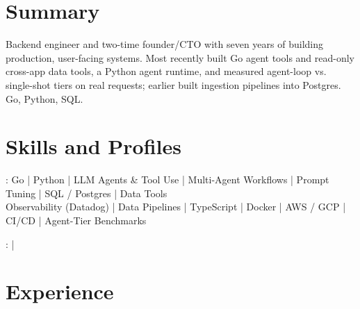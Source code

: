 \documentclass[print]{jack-resume}
\begin{document}
\pagecolor{darkmodeBackground}


\begin{minipage}[t][1cm][t]{.03\textwidth}
    \hfill
\end{minipage}

\section{Summary}
Backend engineer and two-time founder/CTO with seven years of building production, user-facing systems. Most recently built Go agent tools and read-only cross-app data tools, a Python agent runtime, and measured agent-loop vs. single-shot tiers on real requests; earlier built ingestion pipelines into Postgres. Go, Python, SQL.
\sectionsep

\section{Skills and Profiles}
:
Go \hfill | \hfill
Python \hfill | \hfill
LLM Agents \& Tool Use \hfill | \hfill
Multi-Agent Workflows \hfill | \hfill
Prompt Tuning \hfill | \hfill
SQL / Postgres \hfill | \hfill
Data Tools \\
\hspace{1.0cm} Observability (Datadog) \hfill | \hfill
Data Pipelines \hfill | \hfill
TypeScript \hfill | \hfill
Docker \hfill | \hfill
AWS / GCP \hfill | \hfill
CI/CD \hfill | \hfill
Agent-Tier Benchmarks \\

\raggedright{
    :
      \href{https://www.linkedin.com/in/jack-sturtevant/}{ \ExternalLink} |
     \href{https://github.com/jacksturt}{ \ExternalLink}}

\section{Experience}
\end{document}
